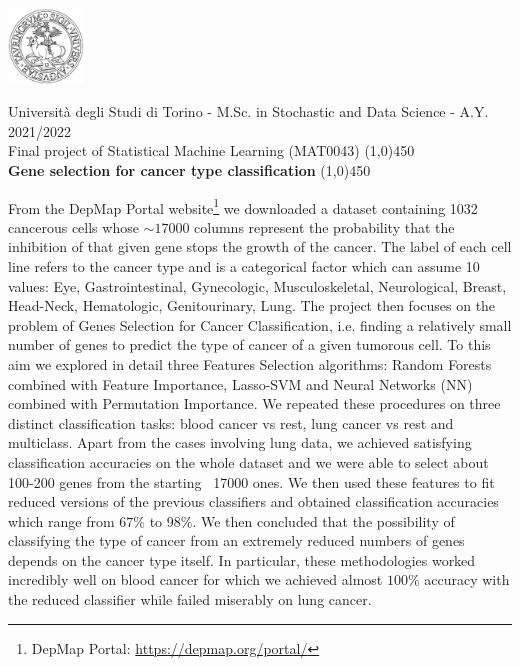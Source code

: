 \documentclass[a4paper,11pt, oneside]{article}  %
\begin{document}
\setcounter{secnumdepth}{2}
\pagestyle{plain} %

\centerline {\includegraphics[width=2cm]{logo.jpg}}
\begin{center}
Università degli Studi di Torino - M.Sc.  in Stochastic and Data Science - A.Y.  2021/2022 \\
\Large { Final project of Statistical Machine Learning (MAT0043)}
\line(1,0){450}\\ 
\vspace{0.4cm} 
{ \huge \textbf{Gene selection for cancer type classification} }
\vspace{0.1cm}
\line(1,0){450} \\
\end{center}


From the DepMap Portal website\footnote{DepMap Portal: \url{https://depmap.org/portal/} } we downloaded a dataset containing 1032 cancerous cells whose $\sim 17000$ columns represent the probability that the inhibition of that given gene stops the growth of the cancer.  The label of each cell line refers to the cancer type and is a categorical factor which can assume 10 values: Eye, Gastrointestinal,  Gynecologic,  Musculoskeletal,  Neurological,  Breast,  Head-Neck,  Hematologic,  Genitourinary,  Lung.  The project then focuses on the problem of Genes Selection for Cancer Classification,  i.e.  finding a relatively small number of genes to predict the type of cancer of a given tumorous cell.  To this aim we explored in detail three Features Selection algorithms: Random Forests combined with Feature Importance,  Lasso-SVM and Neural Networks (NN) combined with Permutation Importance.  We repeated these procedures on three distinct classification tasks: blood cancer vs rest,  lung cancer vs rest and multiclass.  Apart from the cases involving lung data,  we achieved satisfying classification accuracies on the whole dataset and we were able to select about 100-200 genes from the starting ~17000 ones.  We then used these features to fit reduced versions of the previous classifiers and obtained classification accuracies which range from $67\%$ to $98\%$.  We then concluded that the possibility of classifying the type of cancer from an extremely reduced numbers of genes depends on the cancer type itself.  In particular,  these methodologies worked incredibly well on blood cancer for which we achieved almost $100\%$ accuracy with the reduced classifier while failed miserably on lung cancer.  
\end{document}
